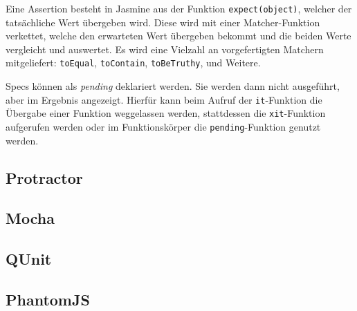 Eine Assertion besteht in Jasmine aus der Funktion \texttt{expect(object)}, welcher der tatsächliche Wert übergeben wird. Diese wird mit einer Matcher-Funktion verkettet, welche den erwarteten Wert übergeben bekommt und die beiden Werte vergleicht und auswertet. Es wird eine Vielzahl an vorgefertigten Matchern mitgeliefert: \texttt{toEqual}, \texttt{toContain}, \texttt{toBeTruthy}, und Weitere\cite{jasmine-introduction, jasmine-cheatsheet}.

\begin{figure}[H]
	
\end{figure}

Specs können als \textit{pending} deklariert werden. Sie werden dann nicht ausgeführt, aber im Ergebnis angezeigt. Hierfür kann beim Aufruf der \texttt{it}-Funktion die Übergabe einer Funktion weggelassen werden, stattdessen die \texttt{xit}-Funktion aufgerufen werden oder im Funktionskörper die \texttt{pending}-Funktion genutzt werden.\cite{jasmine-introduction}

\subsection{Protractor}
\label{sec:Protractor}

\subsection{Mocha}
\label{sec:Mocha}

\subsection{QUnit}
\label{sec:QUnit}

\subsection{PhantomJS}
\label{sec:PhantomJS}